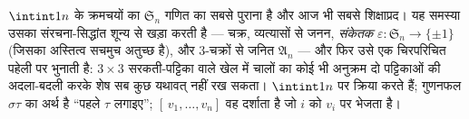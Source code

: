 \begin{problem}\label{pb:b1:structures:1}
$\intint1n$ के क्रमचयों का  $\mathfrak S_n$ गणित का सबसे पुराना  है
और आज भी सबसे शिक्षाप्रद। यह समस्या उसका संरचना-सिद्धांत शून्य से खड़ा करती
है --- चक्र, व्यत्यासों से जनन, \emph{संकेतक}  $\varepsilon \colon
\mathfrak S_n \to \{\pm1\}$ (जिसका अस्तित्व सचमुच अतुच्छ है), और $3$-चक्रों
से जनित  $\mathfrak A_n$ --- और फिर उसे एक चिरपरिचित पहेली
पर भुनाती है: $3 \times 3$ सरकती-पट्टिका वाले खेल में चालों का कोई भी
अनुक्रम दो पट्टिकाओं की अदला-बदली करके शेष सब कुछ यथावत् नहीं रख सकता।
  $\intint1n$
पर क्रिया करते हैं; गुणनफल $\sigma\tau$ का अर्थ है ``पहले $\tau$ लगाइए'';
$[\,v_1, \dots, v_n]$ वह  दर्शाता है जो $i$ को $v_i$ पर भेजता है।


\end{problem}
